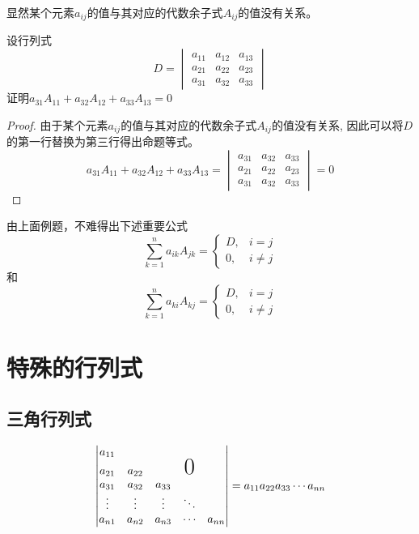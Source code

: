 显然某个元素$a_{ij}$的值与其对应的代数余子式$A_{ij}$的值没有关系。
\begin{example}
    设行列式
    \[
        D =
        \begin{vmatrix}
            a_{11} & a_{12} & a_{13} \\
            a_{21} & a_{22} & a_{23} \\
            a_{31} & a_{32} & a_{33}
        \end{vmatrix}
    \]
    证明$a_{31}A_{11} + a_{32}A_{12} + a_{33}A_{13} = 0$
\end{example}
\begin{proof}
    由于某个元素$a_{ij}$的值与其对应的代数余子式$A_{ij}$的值没有关系,
    因此可以将$D$的第一行替换为第三行得出命题等式。
    \[
        a_{31}A_{11} + a_{32}A_{12} + a_{33}A_{13}
        =
        \begin{vmatrix}
            a_{31} & a_{32} & a_{33} \\
            a_{21} & a_{22} & a_{23} \\
            a_{31} & a_{32} & a_{33}
        \end{vmatrix}
        =
        0
    \]
\end{proof}
由上面例题，不难得出下述重要公式
\begin{equation}
    \sum_{k=1}^n a_{ik}A_{jk} =
    \begin{cases}
        D, & i = j    \\
        0, & i \neq j
    \end{cases}
\end{equation}
和
\begin{equation}
    \sum_{k=1}^n a_{ki}A_{kj} =
    \begin{cases}
        D, & i = j    \\
        0, & i \neq j
    \end{cases}
\end{equation}

\section{特殊的行列式}
\subsection{三角行列式}
\begin{equation}
    \begin{vmatrix}
        a_{11} &        &        &               &        \\
        a_{21} & a_{22} &        & \text{\huge0} &        \\
        a_{31} & a_{32} & a_{33} &               &        \\
        \vdots & \vdots & \vdots & \ddots        &        \\
        a_{n1} & a_{n2} & a_{n3} & \cdots        & a_{nn}
    \end{vmatrix}
    = a_{11}a_{22}a_{33}\cdots a_{nn}
\end{equation}

